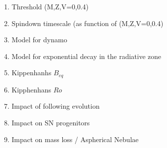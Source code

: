 \begin{enumerate}
\item Threshold (M,Z,V=0,0.4)
\item Spindown timescale (as function of (M,Z,V=0,0.4)
\item Model for dynamo
\item Model for exponential decay in the radiative zone
\item Kippenhanhs $B_{eq}$
\item Kipphenhans $Ro$
\item Impact of following evolution
\item Impact on SN progenitors
\item Impact on mass loss / Aspherical Nebulae
\end{enumerate}